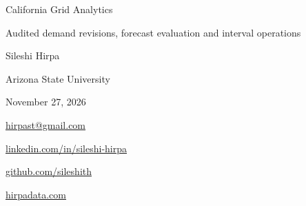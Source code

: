 \thispagestyle{empty}
\vspace*{1in}
{\sffamily\Huge California Grid Analytics\par}
\vspace{0.4in}
{\sffamily\Large Audited demand revisions, forecast evaluation and interval operations\par}
\vspace{0.8in}
{\Large Sileshi Hirpa\par}
Arizona State University\par
November 27, 2026\par
\vspace{0.6in}
\href{mailto:hirpast@gmail.com}{hirpast@gmail.com}\par
\href{https://linkedin.com/in/sileshi-hirpa}{linkedin.com/in/sileshi-hirpa}\par
\href{https://github.com/sileshith}{github.com/sileshith}\par
\href{https://hirpadata.com}{hirpadata.com}\par
\vfill
